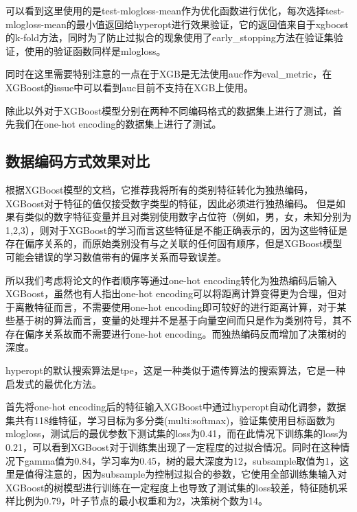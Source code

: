 可以看到这里使用的是test-mlogloss-mean作为优化函数进行优化，每次选择test-mlogloss-mean的最小值返回给hyperopt进行效果验证，它的返回值来自于xgboost的k-fold方法，同时为了防止过拟合的现象使用了early\_stopping方法在验证集验证，使用的验证函数同样是mlogloss。

同时在这里需要特别注意的一点在于XGB是无法使用auc作为eval\_metric，在XGBoost的issue中可以看到auc目前不支持在XGB上使用。

除此以外对于XGBoost模型分别在两种不同编码格式的数据集上进行了测试，首先我们在one-hot encoding的数据集上进行了测试。

\subsection{数据编码方式效果对比}

根据XGBoost模型的文档，它推荐我将所有的类别特征转化为独热编码，XGBoost对于特征的值仅接受数字类型的特征，因此必须进行独热编码。 但是如果有类似的数字特征变量并且对类别使用数字占位符（例如，{男，女，未知}分别为{1,2,3}），则对于XGBoost的学习而言这些特征是不能正确表示的，因为这些特征是存在偏序关系的，而原始类别没有与之关联的任何固有顺序，但是XGBoost模型可能会错误的学习数值带有的偏序关系而导致误差。

所以我们考虑将论文的作者顺序等通过one-hot encoding转化为独热编码后输入XGBoost，虽然也有人指出one-hot encoding可以将距离计算变得更为合理，但对于离散特征而言，不需要使用one-hot encoding即可较好的进行距离计算，对于某些基于树的算法而言，变量的处理并不是基于向量空间而只是作为类别符号，其不存在偏序关系故而不需要进行one-hot encoding。而独热编码反而增加了决策树的深度。

hyperopt的默认搜索算法是tpe，这是一种类似于遗传算法的搜索算法，它是一种启发式的最优化方法。

首先将one-hot encoding后的特征输入XGBoost中通过hyperopt自动化调参，数据集共有118维特征，学习目标为多分类(multi:softmax)，验证集使用目标函数为mlogloss，测试后的最优参数下测试集的loss为0.41，而在此情况下训练集的loss为0.21，可以看到XGBoost对于训练集出现了一定程度的过拟合情况。同时在这种情况下gamma值为0.84，学习率为0.45，树的最大深度为12，subsample取值为1，这里是值得注意的，因为subsample为控制过拟合的参数，它使用全部训练集输入对XGBoost的树模型进行训练在一定程度上也导致了测试集的loss较差，特征随机采样比例为0.79，叶子节点的最小权重和为2，决策树个数为14。

